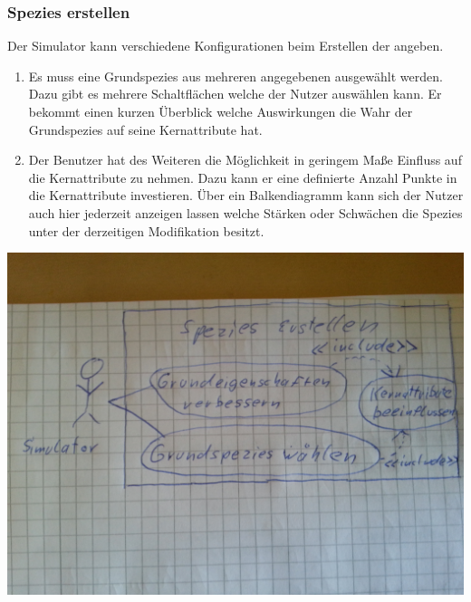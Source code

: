 \documentclass[a4paper, 10pt]{article}
\begin{document}
\subsubsection{Spezies erstellen}
\begin{minipage}{100mm}
Der Simulator kann verschiedene Konfigurationen beim Erstellen der angeben.
\begin{enumerate}
\item Es muss eine Grundspezies aus mehreren angegebenen ausgewählt werden. Dazu gibt es mehrere Schaltflächen welche der Nutzer auswählen kann. Er bekommt einen kurzen Überblick welche Auswirkungen die Wahr der Grundspezies auf seine Kernattribute hat.
\item Der Benutzer hat des Weiteren die Möglichkeit in geringem Maße Einfluss auf die Kernattribute zu nehmen. Dazu kann er eine definierte Anzahl Punkte in die Kernattribute investieren. Über ein Balkendiagramm kann sich der Nutzer auch hier jederzeit anzeigen lassen welche Stärken oder Schwächen die Spezies unter der derzeitigen Modifikation besitzt.
\end{enumerate}
\includegraphics[scale=0.08]{Bilder/UC_Spezies_Erstellen.jpg}
\end{minipage}
\newpage
\end{document}
